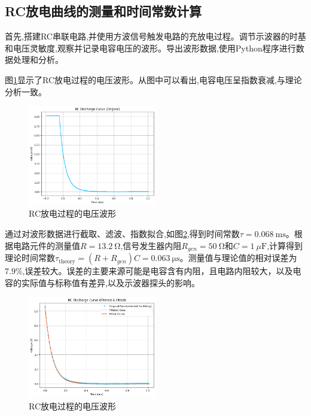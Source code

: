 \documentclass[UTF8]{ctexart}
\begin{document}
\subsection{RC放电曲线的测量和时间常数计算}

首先,搭建RC串联电路,并使用方波信号触发电路的充放电过程。调节示波器的时基和电压灵敏度,观察并记录电容电压的波形。导出波形数据,使用Python程序进行数据处理和分析。

图\ref{fig:rc_discharge}显示了RC放电过程的电压波形。从图中可以看出,电容电压呈指数衰减,与理论分析一致。

\begin{figure}[htbp]
    \centering
    \includegraphics[width=0.5\textwidth]{rc_discharge.png}
    \caption{RC放电过程的电压波形}
    \label{fig:rc_discharge}
\end{figure}

通过对波形数据进行截取、滤波、指数拟合,如图\ref{fig:rc_discharge_preocessed},得到时间常数$\tau = \SI{0.068}{\ms}$。根据电路元件的测量值$R = \SI{13.2}{\ohm}$,信号发生器内阻$R_{gen} = \SI{50}{\ohm}$和$C = \SI{1}{\mu\farad}$,计算得到理论时间常数$\tau_{\text{theory}} =(R+R_{gen})C= \SI{0.063}{\micro\second}$。测量值与理论值的相对误差为$7.9\%$,误差较大。误差的主要来源可能是电容含有内阻，且电路内阻较大，以及电容的实际值与标称值有差异,以及示波器探头的影响。
\begin{figure}[htbp]
    \centering
    \includegraphics[width=0.5\textwidth]{rc_discharge_preocessed.png}
    \caption{RC放电过程的电压波形}
    \label{fig:rc_discharge_preocessed}
\end{figure}
\end{document}
